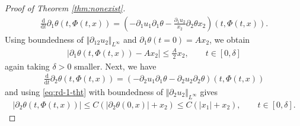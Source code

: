 \documentclass[10pt]{amsart}
\theoremstyle{definition}
\theoremstyle{remark}
\numberwithin{equation}{section}
\newcommand{\nrm}[1]{\Vert#1\Vert}
\newcommand{\ud}{\mathrm{d}}
\newcommand{\rd}{\partial}
\newcommand{\0}{\emptyset}
\newcommand{\dlt}{\delta}
\newcommand{\tht}{\theta}
\begin{document}
\begin{proof}[Proof of Theorem \ref{thm:nonexist}]
\begin{equation}
				\begin{aligned}
					\frac{\ud}{\ud t} \partial_1 \theta (t,\Phi(t,x)) = (-\partial_1 u_1 \partial_1 \theta - \frac{\partial_1u_2}{x_2} \partial_2 \theta x_2)(t,\Phi(t,x)).
				\end{aligned}
			\end{equation} Using boundedness of $\nrm{\rd_{12}u_{2}}_{L^\infty}$ and $\rd_{1}\tht(t=0) = A x_{2}$, we obtain \begin{equation}\label{eq:rd-1-tht}
				\begin{split}
					\left|  \partial_1 \theta (t,\Phi(t,x)) - Ax_{2} \right| \le \frac{A}{2} x_{2} , \qquad t \in [0,\dlt] 
				\end{split}
			\end{equation} again taking $\dlt>0$ smaller. Next, we have 
			\begin{equation}
				\begin{aligned}
					\frac{\ud}{\ud t} \partial_2 \theta (t,\Phi(t,x))  =( - {\partial_2u_1} \partial_1 \theta - \partial_2 u_2 \partial_2 \theta)(t,\Phi(t,x))
				\end{aligned}
			\end{equation} and using \eqref{eq:rd-1-tht} with boundedness of $\nrm{\rd_2u_2}_{L^\infty}$ gives \begin{equation}\label{eq:rd-2-tht}
				\begin{split}
					| \partial_2 \theta (t,\Phi(t,x)) | \le C\left( | \partial_2 \theta (0,x) | + x_{2} \right) \le C(|x_{1}| + x_{2}), \qquad t \in [0,\dlt]. 
				\end{split}
			\end{equation}
			
			
			
			\medskip 
			

\end{proof}
\end{document}
